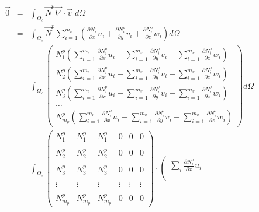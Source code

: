 \begin{eqnarray}
\vec 0&=&\int_{\Omega_e} \vec{N}^p {\vec \nabla}\cdot {\vec v} \; d\Omega \nonumber\\
&=& \int_{\Omega_e} \vec{N}^p \sum_{i=1}^{m_v} 
\left( \frac{\partial N_i^\upnu}{\partial x} u_i + \frac{\partial N_i^\upnu}{\partial y} v_i 
+ \frac{\partial N_i^\upnu}{\partial z} w_i 
\right)  
d\Omega \nonumber\\
&=& 
\int_{\Omega_e} 
\left(
\begin{array}{c}
N_1^p \left(
\sum\limits_{i=1}^{m_v} \frac{\partial N_i^\upnu}{\partial x} u_i +
\sum\limits_{i=1}^{m_v} \frac{\partial N_i^\upnu}{\partial y} v_i +
\sum\limits_{i=1}^{m_v} \frac{\partial N_i^\upnu}{\partial z} w_i  \right) \\
N_2^p \left(
\sum\limits_{i=1}^{m_v} \frac{\partial N_i^\upnu}{\partial x} u_i +
\sum\limits_{i=1}^{m_v} \frac{\partial N_i^\upnu}{\partial y} v_i +
\sum\limits_{i=1}^{m_v} \frac{\partial N_i^\upnu}{\partial z} w_i  \right) \\
N_3^p \left(
\sum\limits_{i=1}^{m_v} \frac{\partial N_i^\upnu}{\partial x} u_i +
\sum\limits_{i=1}^{m_v} \frac{\partial N_i^\upnu}{\partial y} v_i +
\sum\limits_{i=1}^{m_v} \frac{\partial N_i^\upnu}{\partial z} w_i  \right) \\
\dots \\
N_{m_p}^p \left(
\sum\limits_{i=1}^{m_v} \frac{\partial N_i^\upnu}{\partial x} u_i +
\sum\limits_{i=1}^{m_v} \frac{\partial N_i^\upnu}{\partial y} v_i +
\sum\limits_{i=1}^{m_v} \frac{\partial N_i^\upnu}{\partial z} w_i  \right) 
\end{array}
\right) d \Omega \nonumber \\  %
&=& 
\int_{\Omega_e} 
\left(
\begin{array}{cccccc}
{N}_1^p & {N}_1^p & {N}_1^p & 0 & 0 & 0 \\\\
{N}_2^p & {N}_2^p & {N}_2^p & 0 & 0 & 0 \\\\
{N}_3^p & {N}_3^p & {N}_3^p & 0 & 0 & 0 \\\\
\vdots & \vdots & \vdots & \vdots & \vdots & \vdots \\\\
{N}_{m_p}^p & {N}_{m_p}^p & {N}_{m_p}^p & 0 &0 & 0 
\end{array}
\right)
\cdot
\left(
\begin{array}{c}
\sum\limits_i \frac{\partial N_i^\upnu}{\partial x} u_i \\ \\

\end{array}
\end{eqnarray}
